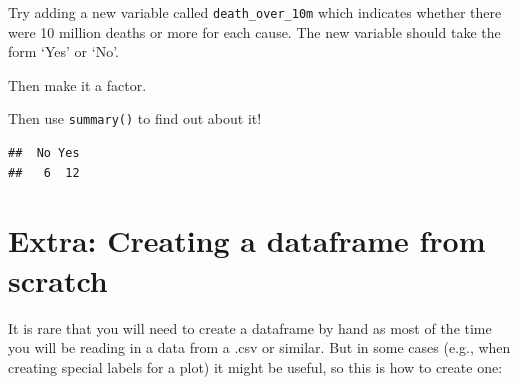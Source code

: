 \documentclass[]{book}
\makeatletter
\newenvironment{Shaded}{\begin{snugshade}}{\end{snugshade}}
\newcommand{\KeywordTok}[1]{\textcolor[rgb]{0.13,0.29,0.53}{\textbf{#1}}}
\newcommand{\DataTypeTok}[1]{\textcolor[rgb]{0.13,0.29,0.53}{#1}}
\newcommand{\DecValTok}[1]{\textcolor[rgb]{0.00,0.00,0.81}{#1}}
\newcommand{\StringTok}[1]{\textcolor[rgb]{0.31,0.60,0.02}{#1}}
\newcommand{\CommentTok}[1]{\textcolor[rgb]{0.56,0.35,0.01}{\textit{#1}}}
\newcommand{\OperatorTok}[1]{\textcolor[rgb]{0.81,0.36,0.00}{\textbf{#1}}}
\newcommand{\NormalTok}[1]{#1}
\newenvironment{kframe}{%
\medskip{}
\setlength{\fboxsep}{.8em}
 \def\at@end@of@kframe{}%
 \ifinner\ifhmode%
  \def\at@end@of@kframe{\end{minipage}}%
  \begin{minipage}{\columnwidth}%
 \fi\fi%
 \def\FrameCommand##1{\hskip\@totalleftmargin \hskip-\fboxsep
 \colorbox{shadecolor}{##1}\hskip-\fboxsep
     \hskip-\linewidth \hskip-\@totalleftmargin \hskip\columnwidth}%
 \MakeFramed {\advance\hsize-\width
   \@totalleftmargin\z@ \linewidth\hsize
   \@setminipage}}%
 {\par\unskip\endMakeFramed%
 \at@end@of@kframe}
\renewenvironment{Shaded}{\begin{kframe}}{\end{kframe}}
\makeatother
\begin{document}
Try adding a new variable called \texttt{death\_over\_10m} which
indicates whether there were 10 million deaths or more for each cause.
The new variable should take the form `Yes' or `No'.

Then make it a factor.

Then use \texttt{summary()} to find out about it!

\begin{Shaded}
\end{Shaded}

\begin{verbatim}
##  No Yes 
##   6  12
\end{verbatim}

\section{Extra: Creating a dataframe from
scratch}\label{extra-creating-a-dataframe-from-scratch}

It is rare that you will need to create a dataframe by hand as most of
the time you will be reading in a data from a .csv or similar. But in
some cases (e.g., when creating special labels for a plot) it might be
useful, so this is how to create one:
\end{document}
